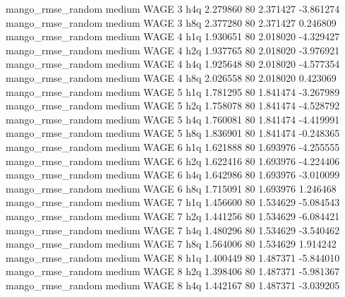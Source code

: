 mango_rmse_random     medium     WAGE                 3                  h4q  2.279860 80       2.371427          -3.861274
mango_rmse_random     medium     WAGE                 3                  h8q  2.377280 80       2.371427           0.246809
mango_rmse_random     medium     WAGE                 4                  h1q  1.930651 80       2.018020          -4.329427
mango_rmse_random     medium     WAGE                 4                  h2q  1.937765 80       2.018020          -3.976921
mango_rmse_random     medium     WAGE                 4                  h4q  1.925648 80       2.018020          -4.577354
mango_rmse_random     medium     WAGE                 4                  h8q  2.026558 80       2.018020           0.423069
mango_rmse_random     medium     WAGE                 5                  h1q  1.781295 80       1.841474          -3.267989
mango_rmse_random     medium     WAGE                 5                  h2q  1.758078 80       1.841474          -4.528792
mango_rmse_random     medium     WAGE                 5                  h4q  1.760081 80       1.841474          -4.419991
mango_rmse_random     medium     WAGE                 5                  h8q  1.836901 80       1.841474          -0.248365
mango_rmse_random     medium     WAGE                 6                  h1q  1.621888 80       1.693976          -4.255555
mango_rmse_random     medium     WAGE                 6                  h2q  1.622416 80       1.693976          -4.224406
mango_rmse_random     medium     WAGE                 6                  h4q  1.642986 80       1.693976          -3.010099
mango_rmse_random     medium     WAGE                 6                  h8q  1.715091 80       1.693976           1.246468
mango_rmse_random     medium     WAGE                 7                  h1q  1.456600 80       1.534629          -5.084543
mango_rmse_random     medium     WAGE                 7                  h2q  1.441256 80       1.534629          -6.084421
mango_rmse_random     medium     WAGE                 7                  h4q  1.480296 80       1.534629          -3.540462
mango_rmse_random     medium     WAGE                 7                  h8q  1.564006 80       1.534629           1.914242
mango_rmse_random     medium     WAGE                 8                  h1q  1.400449 80       1.487371          -5.844010
mango_rmse_random     medium     WAGE                 8                  h2q  1.398406 80       1.487371          -5.981367
mango_rmse_random     medium     WAGE                 8                  h4q  1.442167 80       1.487371          -3.039205
